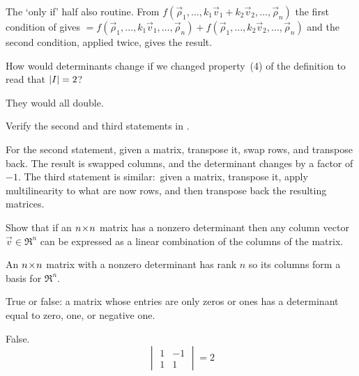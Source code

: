\begin{exercises}
\begin{answer}
         The `only if' half also routine.
         From
         $
           f(\vec{\rho}_1,\dots,k_1\vec{v}_1+k_2\vec{v}_2,
             \dots,\vec{\rho}_n)
         $
         the first condition of  gives
         $
           =
           f(\vec{\rho}_1,\dots,k_1\vec{v}_1,\dots,\vec{\rho}_n)+
           f(\vec{\rho}_1,\dots,k_2\vec{v}_2,\dots,\vec{\rho}_n)
         $
         and the second condition, applied twice, gives the 
         result. 
       \end{answer}
  \item 
    How would determinants change if we changed property~(4) of the
    definition to read that \( \deter{I}=2 \)?
    \begin{answer}
       They would all double.
    \end{answer}
  \item 
    Verify the second and third 
    statements in .
    \begin{answer}
      For the second statement, 
      given a matrix, transpose it, swap rows, and transpose back.
      The result is swapped columns, and the determinant changes by a factor
      of \( -1 \).
      The third statement is similar:~given 
      a matrix, transpose it, apply multilinearity to what are now
      rows, and then transpose back the resulting matrices.
    \end{answer}
  \recommended \item
    Show that if an \( n \! \times \! n \) matrix has a nonzero determinant
    then any column vector
    \( \vec{v}\in\Re^n \) can be expressed as a linear combination
    of the columns of the matrix.
    \begin{answer}
      An \( n \! \times \! n \) matrix with a nonzero determinant has rank
      \( n \) so its columns form a basis for \( \Re^n \).  
    \end{answer}
  \item 
    True or false: a matrix whose entries are only zeros
    or ones has a determinant equal to zero, one, or negative one.
    \cite{Strang}
    \begin{answer}
      False.
      \begin{equation*}
        \begin{vmatrix}
          1  &-1  \\
          1  &1
        \end{vmatrix}
        =2
      \end{equation*} 
     \end{answer}

\end{exercises}
